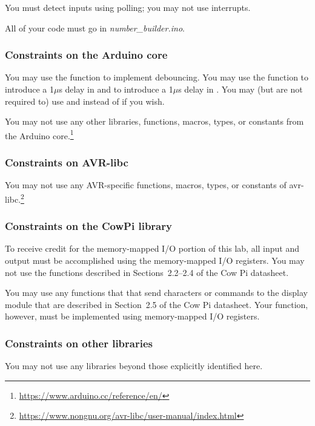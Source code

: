 You must detect inputs using polling; you may not use interrupts.

All of your code must go in \textit{number\_builder.ino}.

\subsubsection{Constraints on the Arduino core}

You may use the  function to implement debouncing.
You may use the  function to introduce a 1$\mu$s delay in  and to introduce a 1$\mu$s delay in .
You may (but are not required to) use  and  instead of  if you wish.

You may not use any other libraries, functions, macros, types, or constants from the Arduino core.\footnote{\url{https://www.arduino.cc/reference/en/}}

\subsubsection{Constraints on AVR-libc}

You may not use any AVR-specific functions, macros, types, or constants of avr-libc.\footnote{\url{https://www.nongnu.org/avr-libc/user-manual/index.html}}

\subsubsection{Constraints on the CowPi library}

To receive credit for the memory-mapped I/O portion of this lab, all input and
output must be accomplished using the memory-mapped I/O registers.
You may not use the functions described in Sections~2.2--2.4 of the Cow Pi datasheet.

You may use any functions that that send characters or commands to the display module that are described in Section~2.5 of the Cow Pi datasheet.
Your  function, however, must be implemented using memory-mapped I/O registers.

\subsubsection{Constraints on other libraries}

You may not use any libraries beyond those explicitly identified here.